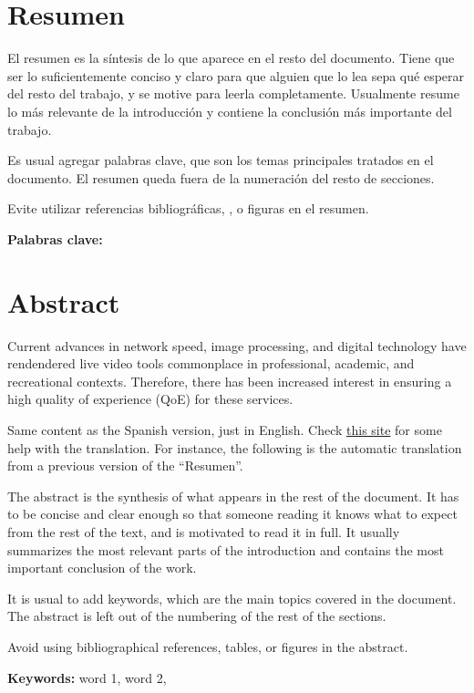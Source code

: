 \chapter*{Resumen}
\thispagestyle{empty}

El resumen es la síntesis de lo que aparece en el resto del
documento. Tiene que ser lo suficientemente conciso y claro para que
alguien que lo lea sepa qué esperar del resto del trabajo, y se motive
para leerla completamente.  Usualmente resume lo más relevante de la
introducción y contiene la conclusión más importante del trabajo.

Es usual agregar palabras clave, que son los temas principales
tratados en el documento. El resumen queda fuera de la numeración del
resto de secciones.

Evite utilizar referencias bibliográficas, \tablas, o figuras en el
resumen.

\bigskip

\textbf{Palabras clave:} \thesisKeywords

\clearpage
\chapter*{Abstract}
\thispagestyle{empty}

Current advances in network speed, image processing, and digital technology have rendendered live video tools commonplace in professional, academic, and recreational contexts. Therefore, there has been increased interest in ensuring a high quality of experience (QoE) for these services.

Same content as the Spanish version, just in English.  Check
\href{https://deepl.com}{this site} for some help with the
translation.  For instance, the following is the automatic translation
from a previous version of the ``Resumen''.

The abstract is the synthesis of what appears in the rest of the
document. It has to be concise and clear enough so that someone
reading it knows what to expect from the rest of the text, and is
motivated to read it in full.  It usually summarizes the most relevant
parts of the introduction and contains the most important conclusion of
the work.

It is usual to add keywords, which are the main topics covered in the
document. The abstract is left out of the numbering of the rest of the
sections.

Avoid using bibliographical references, tables, or figures in the
abstract.

\bigskip

\textbf{Keywords:} word 1, word 2, 

\cleardoublepage

